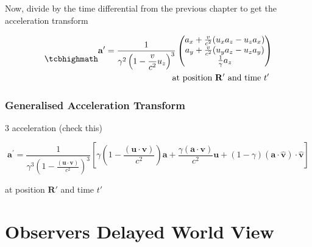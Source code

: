 Now, divide by the time differential from the previous chapter to get the acceleration transform

\begin{equation}
	\mhl{
		\begin{aligned}
			\mathbf{a}' = \dfrac{1}{{\gamma}^2\left(1- \dfrac{v}{c^2} u_z\right)^3 }
			\begin{pmatrix}
				a_x + \frac{v}{c^2}(u_x a_z - u_z a_x) \\
				a_y + \frac{v}{c^2}(u_y a_z - u_z a_y) \\
				\frac{1}{{\gamma}} a_z                 \\
			\end{pmatrix}
			\\
			\text{at position $\mathbf{R}'$ and time $t'$ }
		\end{aligned}
	}
\end{equation}

\subsection{Generalised Acceleration Transform}

3 acceleration (check this)

\begin{equation}
	\mathbf{a^{'}} = \frac{1}{{\gamma} ^3 \left(1-\frac{(\mathbf{u}\cdot \mathbf{v})}{c^2}\right)^3}\left[ {\gamma} \left(1-\frac{(\mathbf{u}\cdot\mathbf{v})}{c^2}\right)\mathbf{a}+\frac{{\gamma} (\mathbf{a}\cdot\mathbf{v})}{c^2}\mathbf{u} + (1-{\gamma} ) (\mathbf{a}\cdot\hat{\mathbf{v}}) \cdot\hat{\mathbf{v}}\right]
\end{equation}

at position $\mathbf{R}'$ and time $t'$



\chapter{Observers Delayed World View}

